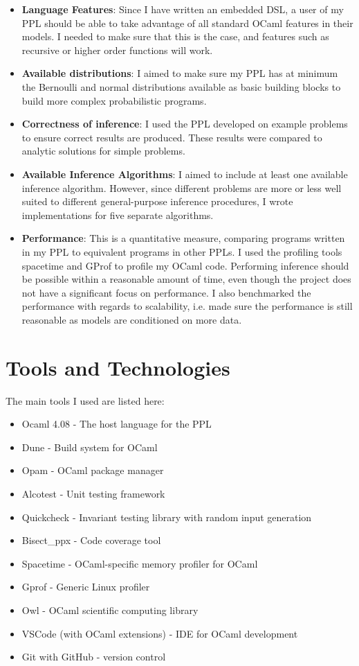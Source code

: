 \begin{itemize}
	\item \textbf{Language Features}: Since I have written an embedded DSL, a user of my PPL should be able to take advantage of all standard OCaml features in their models. I needed to make sure that this is the case, and features such as recursive or higher order functions will work.
	\item \textbf{Available distributions}: I aimed to make sure my PPL has at minimum the Bernoulli and normal distributions available as basic building blocks to build more complex probabilistic programs.
	\item \textbf{Correctness of inference}: I used the PPL developed on example problems to ensure correct results are produced. These results were compared to analytic solutions for simple problems.
	\item \textbf{Available Inference Algorithms}: I aimed to include at least one available inference algorithm. However, since different problems are more or less well suited to different general-purpose inference procedures, I wrote implementations for five separate algorithms.
	\item \textbf{Performance}: This is a quantitative measure, comparing programs written in my PPL to equivalent programs in other PPLs. I used the profiling tools spacetime and GProf to profile my OCaml code. Performing inference should be possible within a reasonable amount of time, even though the project does not have a significant focus on performance. I also benchmarked the performance with regards to scalability, i.e. made sure the performance is still reasonable as models are conditioned on more data.
\end{itemize}

\section{Tools and Technologies}
The main tools I used are listed here:
\begin{itemize}[itemsep=-1ex]
	\item Ocaml 4.08 - The host language for the PPL 
	\item Dune - Build system for OCaml
	\item Opam - OCaml package manager
	\item Alcotest - Unit testing framework
	\item Quickcheck - Invariant testing library with random input generation
	\item Bisect\_ppx - Code coverage tool
	\item Spacetime - OCaml-specific memory profiler for OCaml
	\item Gprof - Generic Linux profiler
	\item Owl -  OCaml scientific computing library
	\item VSCode (with OCaml extensions) - IDE for OCaml development
	\item Git with GitHub - version control
\end{itemize}

